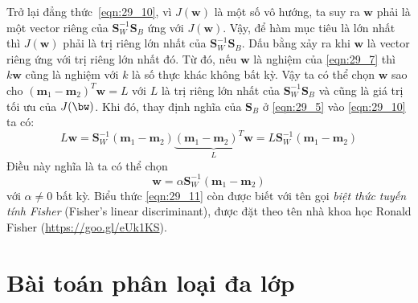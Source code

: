 Trở lại đẳng thức~\eqref{eqn:29_10}, vì $J(\mathbf{w})$ là một số vô
hướng, ta suy ra $\mathbf{w}$ phải là một vector riêng của
$\mathbf{S}_W^{-1}\mathbf{S}_B$ ứng với $J(\mathbf{w})$. Vậy, để hàm mục tiêu là
lớn nhất thì $J(\mathbf{w})$ phải là trị riêng lớn nhất của
$\mathbf{S}_W^{-1}\mathbf{S}_B$. Dấu bằng xảy ra khi $\mathbf{w}$ là vector
riêng ứng với trị riêng lớn nhất đó. 
Từ đó, nếu $\mathbf{w}$ là nghiệm của \eqref{eqn:29_7} thì
$k\mathbf{w}$ cũng là nghiệm với $k$ là số thực khác không bất kỳ. Vậy ta có thể
chọn $\mathbf{w}$ sao cho $(\mathbf{m}_1 - \mathbf{m}_2)^T\mathbf{w} =  L$ với
$L$ là trị riêng lớn nhất của $\mathbf{S}_W^{-1}\mathbf{S}_B$ và cũng là giá
trị tối ưu của $J(\bw)$. Khi đó, thay định nghĩa của $\mathbf{S}_B$ ở
\eqref{eqn:29_5} vào \eqref{eqn:29_10} ta có:
\begin{equation} 
L \mathbf{w} = \mathbf{S}_{W}^{-1}(\mathbf{m}_1 - \mathbf{m}_2)\underbrace{(\mathbf{m}_1 - \mathbf{m}_2)^T\mathbf{w}}_L =  L\mathbf{S}_{W}^{-1}(\mathbf{m}_1 - \mathbf{m}_2) 
\end{equation} 
Điều này nghĩa là ta có thể chọn
\begin{equation} 
\label{eqn:29_11}
\mathbf{w} = \alpha\mathbf{S}_{W}^{-1}(\mathbf{m}_1 - \mathbf{m}_2)
\end{equation} 
với $\alpha \neq 0$ bất kỳ. Biểu thức \eqref{eqn:29_11} còn được biết với tên gọi \textit{biệt thức tuyến tính Fisher}
({Fisher's linear discriminant}), được đặt theo tên nhà khoa học Ronald 
Fisher (\url{https://goo.gl/eUk1KS}).
 
 
\section{Bài toán phân loại đa lớp}
\label{sec:29_3} 
 
